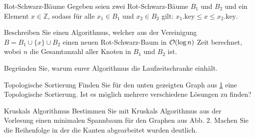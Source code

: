 \documentclass{exercisesheet}
\begin{document}
\begin{eexercises}{Rot-Schwarz-Bäume}{
    Gegeben seien zwei Rot-Schwarz-Bäume $B_1$ und $B_2$ und ein Element $x \in \mathbb{Z}$, sodass für alle $x_1 \in B_1$ und $x_2 \in B_2$ gilt: $x_1.\text{key} \leq x \leq x_2.\text{key}$.
  }
  \item Beschreiben Sie einen Algorithmus, welcher aus der Vereinigung $B = B_1 \cup \{x\} \cup B_2$ einen neuen Rot-Schwarz-Baum in $\mathcal{O}(\log n)$ Zeit berechnet, wobei $n$ die Gesamtanzahl aller Knoten in $B_1$ und $B_2$ ist.
  \item Begründen Sie, warum eurer Algorithmus die Laufzeitschranke einhält.
\end{eexercises}



\begin{exercise}{Topologische Sortierung}
  Finden Sie für den unten gezeigten Graph aus \ref{fig:topo} eine Topologische Sortierung. Ist es möglich mehrere verschiedene Lösungen zu finden?
  \begin{figure}[ht]\label{fig:topo}
  \end{figure}
\end{exercise}

\begin{exercise}{Kruskals Algorithmus}
  Bestimmen Sie mit Kruskals Algorithmus aus der Vorlesung einen minimalen Spannbaum für den Graphen aus Abb. 2. Machen Sie die Reihenfolge in der die Kanten abgearbeitet wurden deutlich.
  \begin{figure}[ht]
  \end{figure}
\end{exercise}
\end{document}
